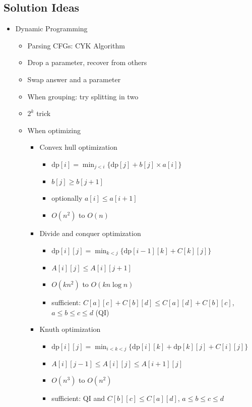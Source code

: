 \documentclass[8pt,a4paper,landscape,oneside]{amsart}
\newenvironment{myitemize}
{\begin{itemize}[leftmargin=.3cm]
	\setlength{\itemsep}{0pt}
	\setlength{\parskip}{0pt}
	\setlength{\parsep}{0pt}     }
{ \end{itemize}                  }
\begin{document}
\begin{multicols*}{3}
\subsection{Solution Ideas}
\begin{myitemize}
	\item Dynamic Programming
		\begin{itemize}
			\item Parsing CFGs: CYK Algorithm
			\item Drop a parameter, recover from others
			\item Swap answer and a parameter
			\item When grouping: try splitting in two
			\item $2^k$ trick
			\item When optimizing
				\begin{itemize}
					\item Convex hull optimization
						\begin{itemize}
							\item $\mathrm{dp}[i] = \min_{j<i}\{\mathrm{dp}[j] + b[j] \times a[i]\}$
							\item $b[j] \geq b[j+1]$
							\item optionally $a[i] \leq a[i+1]$
							\item $O(n^2)$ to $O(n)$
						\end{itemize}
					\item Divide and conquer optimization
						\begin{itemize}
							\item $\mathrm{dp}[i][j] = \min_{k<j}\{\mathrm{dp}[i-1][k] + C[k][j]\}$
							\item $A[i][j] \leq A[i][j+1]$
							\item $O(kn^2)$ to $O(kn\log{n})$
							\item sufficient: $C[a][c] + C[b][d] \leq C[a][d] + C[b][c]$, $a\leq b\leq c\leq d$ (QI)
						\end{itemize}
					\item Knuth optimization
						\begin{itemize}
							\item $\mathrm{dp}[i][j] = \min_{i<k<j}\{\mathrm{dp}[i][k] + \mathrm{dp}[k][j] + C[i][j]\}$
							\item $A[i][j-1] \leq A[i][j] \leq A[i+1][j]$
							\item $O(n^3)$ to $O(n^2)$
							\item sufficient: QI and $C[b][c] \leq C[a][d]$, $a\leq b\leq c\leq d$

\end{itemize}
\end{itemize}
\end{itemize}
\end{myitemize}
\end{multicols*}
\end{document}
